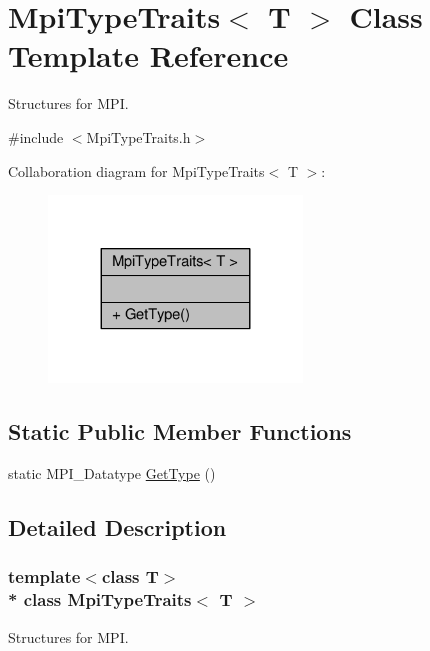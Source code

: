 \hypertarget{structMpiTypeTraits}{}\section{Mpi\+Type\+Traits$<$ T $>$ Class Template Reference}
\label{structMpiTypeTraits}


Structures for M\+PI.  




{\ttfamily \#include $<$Mpi\+Type\+Traits.\+h$>$}



Collaboration diagram for Mpi\+Type\+Traits$<$ T $>$\+:\nopagebreak
\begin{figure}[H]
\begin{center}
\leavevmode
\includegraphics[width=191pt]{structMpiTypeTraits__coll__graph}
\end{center}
\end{figure}
\subsection*{Static Public Member Functions}
\begin{DoxyCompactItemize}
\item 
static M\+P\+I\+\_\+\+Datatype \hyperlink{structMpiTypeTraits_ae839c28621a048734d2ad38f6272a4f1}{Get\+Type} ()
\end{DoxyCompactItemize}


\subsection{Detailed Description}
\subsubsection*{template$<$class T$>$\\*
class Mpi\+Type\+Traits$<$ T $>$}

Structures for M\+PI. 

